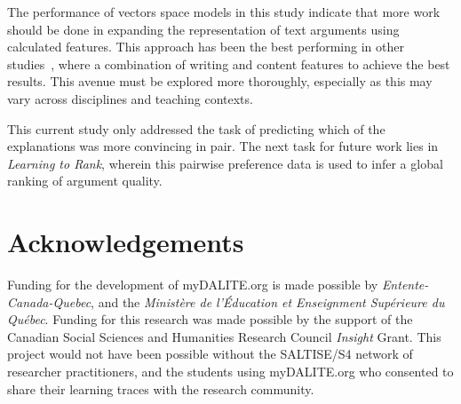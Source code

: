 \documentclass[runningheads]{llncs}
\begin{document}
The performance of vectors space models in this study indicate that more work 
should be done in expanding the representation of text arguments using 
calculated features.
This approach has been the best performing in other 
studies~\cite{louis_what_2013,nguyen_computational_2015}, where a 
combination of writing and content features to achieve the best 
results. 
This avenue must be explored more thoroughly, especially as 
this may vary across disciplines and teaching contexts. 


This current study only addressed the task of predicting which of the 
explanations was more convincing in pair. 
The next task for future work lies in \textit{Learning to Rank}, wherein this 
pairwise preference data is used to infer a global ranking of argument quality.





\section{Acknowledgements}
Funding for the development of myDALITE.org is made possible by 
\textit{Entente-Canada-Quebec}, and the \textit{Ministère de 
	l'Éducation et Enseignment Supérieure du Québec}. Funding for this research 
	was 
made possible by the support of the Canadian Social Sciences and Humanities 
Research Council \textit{Insight} Grant. This project would 
not have been possible without the SALTISE/S4 network of researcher 
practitioners, and the students using myDALITE.org who consented to share 
their learning traces with the research community.

 
 
\end{document}
